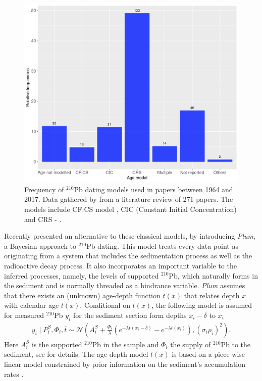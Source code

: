 \documentclass [10pt] {article}
\begin{document}
\begin{figure}[h!]
	\begin{centering}
		\includegraphics[width=.75\linewidth]{210Pbmodels-bar.pdf}
		\caption{Frequency of $^{210}$Pb dating models used in papers between 1964 and 2017. Data gathered by \citet{Courtney2019} from a literature review of 271 papers. The models include CF:CS model \citep[The Constant Flux - Constant Sedimentation;][]{Robbins1978}, CIC (Constant Initial Concentration) \citep{Goldberg1963,Crozaz1964,Robbins1978} and CRS -  \citep[Constant Rate of Supply;][]{Appleby1978,Robbins1978}. }
		\label{fig:210models}
	\end{centering}
\end{figure}

Recently \citet{Aquino2018} presented an alternative to these classical models, by introducing \textit{Plum}, a Bayesian approach to $^{210}$Pb dating.
This model treats every data point as originating from a system that includes the sedimentation process as well as the radioactive decay process. 
It also incorporates an important variable to the inferred processes, namely, the levels of supported $^{210}$Pb, which naturally forms in the sediment and is normally threaded as a hindrance variable.
\textit{Plum} assumes that there exists an (unknown) age-depth function $t(x)$ that relates depth $x$ with calendar age $t(x)$.  Conditional on $t(x)$, the following model is assumed for measured $^{210}$Pb $y_i$ for the sediment section form depths $x_i - \delta$ to $x_i$
\begin{eqnarray}
y_i\mid P^S_i, \Phi_i, \bar{t}\sim \mathcal{N} \left(A^S_i+\frac{\Phi_i}{\lambda} \left( e^{-\lambda t(x_i-\delta)} - e^{-\lambda t(x_i)} \right), (\sigma_i\rho_i)^2 \right). 
\end{eqnarray}
Here $A_i^S$ is the supported $^{210}$Pb in the sample and $\Phi_i$ the supply of $^{210}$Pb to the sediment, see \cite{Aquino2018} for details. 
The age-depth model $t(x)$ is based on a piece-wise linear model constrained by prior information on the sediment's accumulation rates  \citep{Blaauw2011}.%
\end{document}
